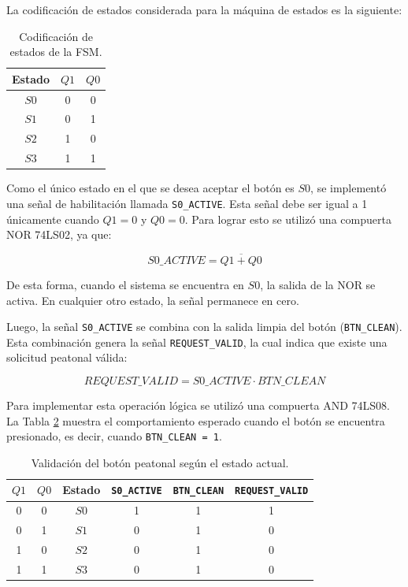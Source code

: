 \documentclass[12pt,onecolumn]{IEEEtran}
\begin{document}
La codificación de estados considerada para la máquina de estados es la siguiente:

\begin{table}[H]
    \centering
    \caption{Codificación de estados de la FSM.}
    \begin{tabular}{|c|c|c|}
        \hline
        Estado & $Q1$ & $Q0$ \\
        \hline
        $S0$ & 0 & 0 \\
        \hline
        $S1$ & 0 & 1 \\
        \hline
        $S2$ & 1 & 0 \\
        \hline
        $S3$ & 1 & 1 \\
        \hline
    \end{tabular}
    \label{tab:codificacion_fsm}
\end{table}

Como el único estado en el que se desea aceptar el botón es $S0$, se implementó una señal de habilitación llamada \texttt{S0\_ACTIVE}. Esta señal debe ser igual a 1 únicamente cuando $Q1=0$ y $Q0=0$. Para lograr esto se utilizó una compuerta NOR 74LS02, ya que:

\begin{equation}
    S0\_ACTIVE = \overline{Q1 + Q0}
\end{equation}

De esta forma, cuando el sistema se encuentra en $S0$, la salida de la NOR se activa. En cualquier otro estado, la señal permanece en cero.

Luego, la señal \texttt{S0\_ACTIVE} se combina con la salida limpia del botón (\texttt{BTN\_CLEAN}). Esta combinación genera la señal \texttt{REQUEST\_VALID}, la cual indica que existe una solicitud peatonal válida:

\begin{equation}
    REQUEST\_VALID = S0\_ACTIVE \cdot BTN\_CLEAN
\end{equation}

Para implementar esta operación lógica se utilizó una compuerta AND 74LS08. La Tabla \ref{tab:request_valid} muestra el comportamiento esperado cuando el botón se encuentra presionado, es decir, cuando \texttt{BTN\_CLEAN = 1}.

\begin{table}[H]
    \centering
    \caption{Validación del botón peatonal según el estado actual.}
    \begin{tabular}{|c|c|c|c|c|c|}
        \hline
        $Q1$ & $Q0$ & Estado & \texttt{S0\_ACTIVE} & \texttt{BTN\_CLEAN} & \texttt{REQUEST\_VALID} \\
        \hline
        0 & 0 & $S0$ & 1 & 1 & 1 \\
        \hline
        0 & 1 & $S1$ & 0 & 1 & 0 \\
        \hline
        1 & 0 & $S2$ & 0 & 1 & 0 \\
        \hline
        1 & 1 & $S3$ & 0 & 1 & 0 \\
        \hline
    \end{tabular}
    \label{tab:request_valid}
\end{table}
\end{document}
